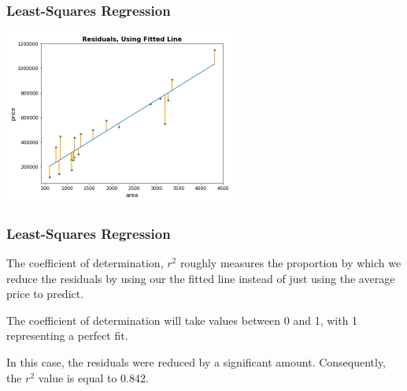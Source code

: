 \documentclass[11pt, table]{beamer}
\newcommand{\p}{\pause}
\begin{document}
\begin{frame}
\frametitle{Least-Squares Regression}

\begin{center}
	\includegraphics[width=3in]{images/Appraisal_Values/r2_02.png}
\end{center}

\end{frame}

\begin{frame}
\frametitle{Least-Squares Regression}
The coefficient of determination, $r^2$ roughly measures the proportion by which we reduce the residuals by using our the fitted line instead of just using the average price to predict.\p
\vspace{0.1in}

The coefficient of determination will take values between 0 and 1, with 1 representing a perfect fit.\p
\vspace{0.1in}

In this case, the residuals were reduced by a significant amount. Consequently, the $r^2$ value is equal to 0.842.
\end{frame}
\end{document}
